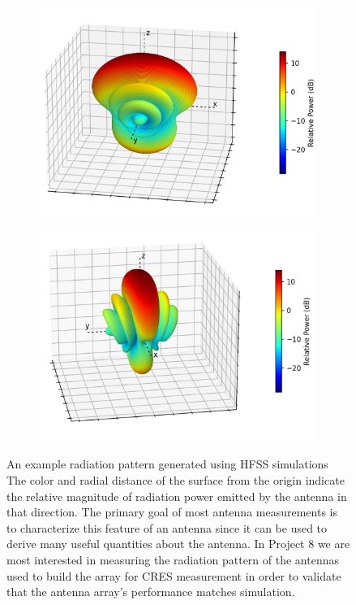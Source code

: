 \begin{figure}[htbp]
    \centering
    \begin{subfigure}[b]{0.48\textwidth}
        \centering
        \includegraphics[width=1\textwidth]{figs/Chapter-5/230419_example_radiation_pattern2.png}
        \caption{\label{fig:rad-pattern-ex1}}
    \end{subfigure}
    \hfill
    \begin{subfigure}[b]{0.48\textwidth}
        \centering
        \includegraphics[width=1\textwidth]{figs/Chapter-5/230419_example_radiation_pattern.png}
        \caption{\label{fig:rad-pattern-ex2}}
    \end{subfigure}
    \hfill
    \caption{An example radiation pattern generated using HFSS simulations The color and radial distance of the surface from the origin indicate the relative magnitude of radiation power emitted by the antenna in that direction. The primary goal of most antenna measurements is to characterize this feature of an antenna since it can be used to derive many useful quantities about the antenna. In Project 8 we are most interested in measuring the radiation pattern of the antennas used to build the array for CRES measurement in order to validate that the antenna array's performance matches simulation.}
    \qquad
    \label{fig:rad-pattern-examples}
\end{figure}

